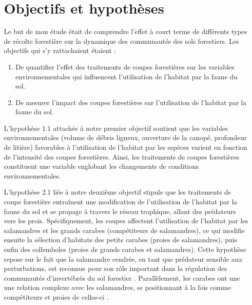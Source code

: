 \section*{Objectifs et hypothèses}
\label{sec:objectifs}

Le but de mon étude était de comprendre l’effet à court terme de différents types de récolte forestière sur la dynamique des communautés des sols forestiers. 
Les objectifs qui s’y rattachaient étaient :

\begin{enumerate}
    \item De quantifier l'effet des traitements de coupes forestières sur les variables environnementales qui influencent l'utilisation de l'habitat par la faune du sol. 
    \item De mesurer l'impact des coupes forestières sur l'utilisation de l'habitat par la faune du sol.
\end{enumerate}

L’hypothèse 1.1 attachée à notre premier objectif soutient que les variables environnementales (volume de débris ligneux, ouverture de la canopé, profondeur de litière) favorables à l’utilisation de l’habitat par les espèces varient en fonction de l’intensité des coupes forestières. 
Ainsi, les traitements de coupes forestières constituent une variable englobant les changements de conditions environnementales. 

L'hypothèse 2.1 liée à notre deuxième objectif stipule que les traitements de coupe forestière entraînent une modification de l'utilisation de l'habitat 
par la faune du sol et se propage à travers le réseau trophique, allant des prédateurs vers les prois. 
Spécifiquement, les coupes affectent l'utilisation de l'habitat par les salamandres et les grands carabes (compétiteurs de salamandres), 
ce qui modifie ensuite la sélection d'habitats des petits carabes (proies de salamandres), puis enfin des collemboles (proies de grands carabes et salamandres). 
Cette hypothèse repose sur le fait que la salamandre cendrée, en tant que prédateur sensible aux perturbations, est reconnue pour son rôle important dans la régulation des communautés d'invertébrés du sol forestier \citep{Wyman1998Experimentalassessment,MichaelWalton2005Salamandersforestfloor,Walton2006Salamandersforestfloor,Walton2013Topdownregulation,Hickerson2017Easternredbacked}. 
Parallèlement, les carabes ont une une relation complexe avec les salamandres, se positionnant à la fois comme compétiteurs et proies de celles-ci \citep{Jaeger1980MicrohabitatsTerrestrial,loveiEcologyBehaviorGround1996,Gall2003behavioralinteractions}. 


\cleardoublepage



